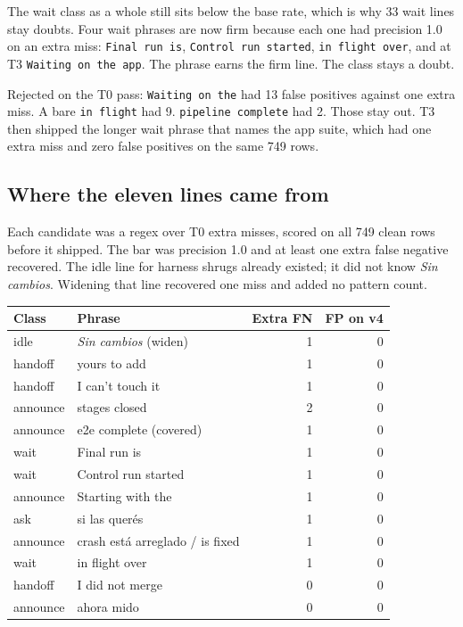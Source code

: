 The wait class as a whole still sits below the base rate, which is
why 33 wait lines stay doubts. Four wait phrases are now firm
because each one had precision 1.0 on an extra miss:
\texttt{Final run is}, \texttt{Control run started},
\texttt{in flight over}, and at T3 \texttt{Waiting on the app}.
The phrase earns the firm line. The class stays a doubt.

Rejected on the T0 pass: \texttt{Waiting on the} had 13 false
positives against one extra miss. A bare \texttt{in flight} had 9.
\texttt{pipeline complete} had 2. Those stay out. T3 then shipped
the longer wait phrase that names the app suite, which had one extra
miss and zero false positives on the same 749 rows.

\subsection{Where the eleven lines came from}
\label{sec:eleven}

Each candidate was a regex over T0 extra misses, scored on all 749
clean rows before it shipped. The bar was precision 1.0 and at least
one extra false negative recovered. The idle line for harness shrugs
already existed; it did not know \emph{Sin cambios}. Widening that
line recovered one miss and added no pattern count.

\begin{center}
{\small\begin{tabular}{llrr}
\toprule
Class & Phrase & Extra FN & FP on v4 \\
\midrule
idle & \emph{Sin cambios} (widen) & 1 & 0 \\
handoff & yours to add & 1 & 0 \\
handoff & I can't touch it & 1 & 0 \\
announce & stages closed & 2 & 0 \\
announce & e2e complete (covered) & 1 & 0 \\
wait & Final run is & 1 & 0 \\
wait & Control run started & 1 & 0 \\
announce & Starting with the & 1 & 0 \\
ask & si las quer\'es & 1 & 0 \\
announce & crash est\'a arreglado / is fixed & 1 & 0 \\
wait & in flight over & 1 & 0 \\
handoff & I did not merge & 0 & 0 \\
announce & ahora mido & 0 & 0 \\
\bottomrule
\end{tabular}}
\end{center}

